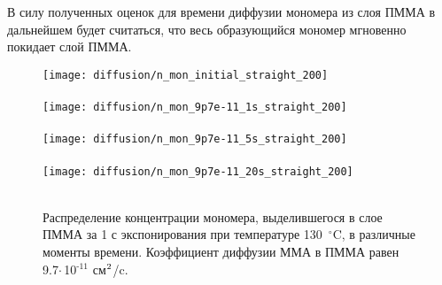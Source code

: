 В силу полученных оценок для времени диффузии мономера из слоя \linebreak ПММА в дальнейшем будет считаться, что весь образующийся мономер мгновенно покидает слой ПММА.

\begin{figure}[H]
	\begin{center}
		\texttt{[image: diffusion/n\_mon\_initial\_straight\_200]} \\
		\vspace{-4em}  \vspace{2.2em} \\
		\texttt{[image: diffusion/n\_mon\_9p7e-11\_1s\_straight\_200]} \\
		\vspace{-4em}  \vspace{2.2em} \\
		\texttt{[image: diffusion/n\_mon\_9p7e-11\_5s\_straight\_200]} \\
		\vspace{-4em}  \vspace{2.2em} \\
		\texttt{[image: diffusion/n\_mon\_9p7e-11\_20s\_straight\_200]} \\
		\vspace{-4em}  \vspace{2.2em} \\
	\end{center}
	\vspace{-1em}
	\caption{Распределение концентрации мономера, выделившегося в слое ПММА за 1 с экспонирования при температуре 130~$^\circ$C, в различные моменты времени. Коэффициент диффузии ММА в ПММА равен 9.7\:$\cdot$\,10$^\text{-11}$ см$^\text{2}$/c.}
	\label{fig:diffusion_initial}
\end{figure}

\newpage

